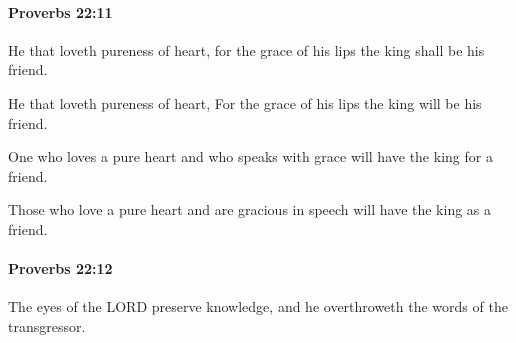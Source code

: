 		\paragraph{Proverbs 22:11} %
			\label{PROVERBS-22-11}

			He that loveth pureness of heart, for the grace of his lips the king shall be his friend.

			\begin{versebox}
					\item[BHS] 
					\item[ASV] He that loveth pureness of heart, For the grace of his lips the king will be his friend.
					\item[NIV] One who loves a pure heart and who speaks with grace will have the king for a friend.
					\item[NRSV] Those who love a pure heart and are gracious in speech will have the king as a friend.
			\end{versebox}

		\paragraph{Proverbs 22:12} %
			\label{PROVERBS-22-12}

			The eyes of the LORD preserve knowledge, and he overthroweth the words of the transgressor.

